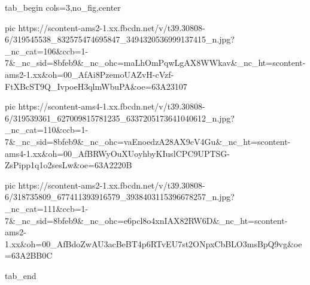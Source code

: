  
 
 
 
 


\ifcmt
  tab_begin cols=3,no_fig,center

     pic https://scontent-ams2-1.xx.fbcdn.net/v/t39.30808-6/319545538_832575474695847_3494320536999137415_n.jpg?_nc_cat=106&ccb=1-7&_nc_sid=8bfeb9&_nc_ohc=maLhOmPqwLgAX8WWkav&_nc_ht=scontent-ams2-1.xx&oh=00_AfAi8PzemoUAZvH-cVzf-FtXBcST9Q_IvpoeH3qlmWbuPA&oe=63A23107

     pic https://scontent-ams4-1.xx.fbcdn.net/v/t39.30808-6/319539361_627009815781235_6337205173641040612_n.jpg?_nc_cat=110&ccb=1-7&_nc_sid=8bfeb9&_nc_ohc=vaEnoedzA28AX9cV4Gu&_nc_ht=scontent-ams4-1.xx&oh=00_AfBRWyOuXUoyhbyKIuslCPC9UPTSG-ZsPipp1q1o2sesLw&oe=63A2220B

     pic https://scontent-ams2-1.xx.fbcdn.net/v/t39.30808-6/318735809_677411393916579_3938403115396678257_n.jpg?_nc_cat=111&ccb=1-7&_nc_sid=8bfeb9&_nc_ohc=e6pcl8o4xnIAX82RW6D&_nc_ht=scontent-ams2-1.xx&oh=00_AfBdoZwAU3acBeBT4p6RTvEU7st2ONpxCbBLO3msBpQ9vg&oe=63A2BB0C

  tab_end
\fi
